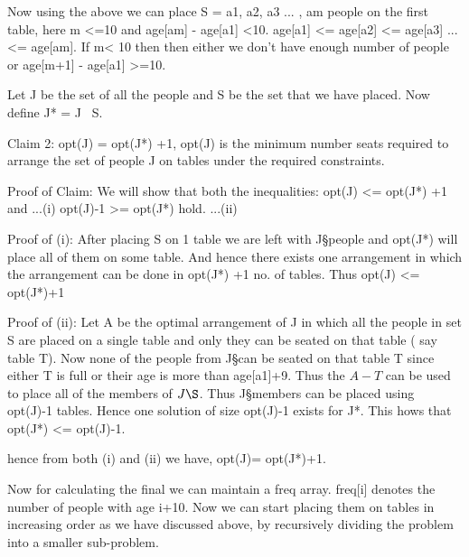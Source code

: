 \documentclass{article}
\begin{document}
Now using the above we can place S  = {a1, a2, a3 ... , am} people on the first table, here m <=10 and age[am] - age[a1] <10. age[a1] <= age[a2] <= age[a3] ... <= age[am]. If m< 10 then then either we don't have enough number of people or age[m+1] - age[a1] >=10. 

Let J be the set of all the people and S be the set that we have placed. Now define J* = J \ S.

Claim 2: opt(J) = opt(J*) +1, opt(J) is the minimum number seats required to arrange the set of people J on tables under the required constraints.

Proof of Claim:
We will show that both the inequalities: 
opt(J) <= opt(J*) +1 and        ...(i)
opt(J)-1 >= opt(J*) hold.       ...(ii)

Proof of (i):
After placing S on 1 table we are left with J\S people and opt(J*) will place all of them on some table. And hence there exists one arrangement in which the arrangement can be done in opt(J*) +1 no. of tables. Thus opt(J) <= opt(J*)+1

Proof of (ii):
Let A be the optimal arrangement of J in which all the people in set S are placed on a single table and only they can be seated on that table ( say table T). Now none of the people from J\S can be seated on that table T since either T is full or their age is more than age[a1]+9. Thus the $A-T$ can be used to place all of the members of $J\S$. Thus J\S members can be placed using opt(J)-1 tables. Hence one solution of size opt(J)-1 exists for J*. This hows that opt(J*) <= opt(J)-1.

hence from both (i) and (ii) we have, opt(J)= opt(J*)+1.

Now for calculating the final we can maintain a freq array. freq[i]  denotes the number of people with age i+10. Now we can start placing them on tables in increasing order as we have discussed above, by recursively dividing the problem into a smaller sub-problem. 
\end{document}
